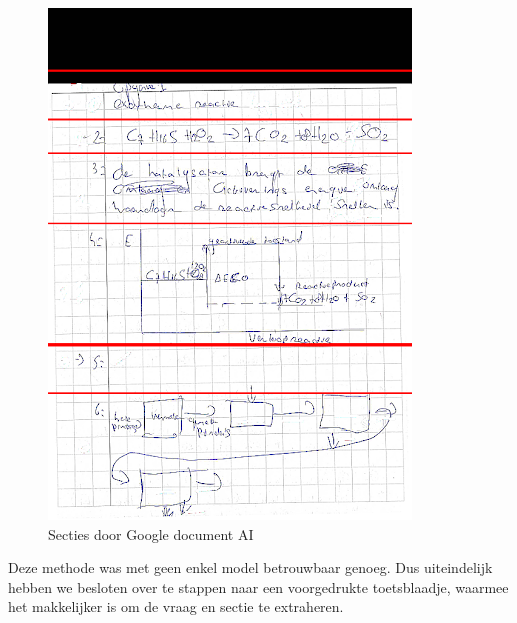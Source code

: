 \documentclass[12pt]{article}
\begin{document}
\begin{multicols}{2}
\begin{figure}
    \includegraphics[width=1\linewidth]{./images/methoden/inscannen/sectie/hand/section.png}
    \caption{Secties door Google document AI}\label{fig:sec-google-doc-api}
\end{figure}
Deze methode was met geen enkel model betrouwbaar genoeg.
Dus uiteindelijk hebben we besloten over te stappen naar een voorgedrukte toetsblaadje, waarmee het makkelijker is  om de vraag en sectie te extraheren.
\end{multicols} 
\pagebreak
\end{document}
